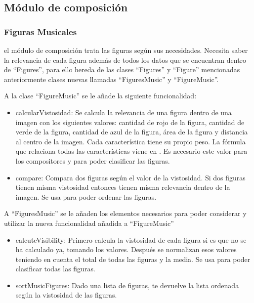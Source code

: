\subsection{Módulo de composición}


\subsubsection{Figuras Musicales}

el módulo de composición trata las figuras según sus necesidades. Necesita saber la relevancia de cada figura además de todos los datos que se encuentran dentro de ``Figures'', para ello hereda de las clases ``Figures'' y ``Figure'' mencionadas anteriormente  clases nuevas llamadas ``FiguresMusic'' y ``FigureMusic''.


A la clase ``FigureMusic'' se le añade la siguiente funcionalidad:
\begin{itemize}
\item{calcularVistosidad}: Se calcula la relevancia de una figura dentro de una imagen con los siguientes valores: cantidad de rojo de la figura, cantidad de verde de la figura, cantidad de azul de la figura, área de la figura y distancia al centro de la imagen. Cada característica tiene su propio peso. La fórmula que relaciona todas las características viene en . Es necesario este valor para los compositores y para poder clasificar las figuras.
\item{compare}: Compara dos figuras según el valor de la vistosidad. Si dos figuras tienen misma vistosidad entonces tienen misma relevancia dentro de la imagen. Se usa para poder ordenar las figuras.
\end{itemize}

A ``FiguresMusic'' se le añaden los elementos necesarios para poder considerar y utilizar la nueva funcionalidad añadida a ``FigureMusic''
\begin{itemize}
\item{calcuteVisibility}: Primero calcula la vistosidad de cada figura si es que no se ha calculado ya, tomando los valores. Después se normalizan esos valores teniendo en cuenta el total de todas las figuras y la media. Se usa para poder clasificar todas las figuras.
\item{sortMusicFigures}: Dado una lista de figuras, te devuelve la lista ordenada según la vistosidad de las figuras.
\end{itemize}